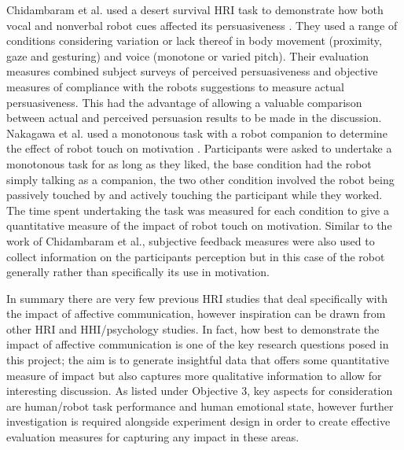 \documentclass[11pt]{article}
\begin{document}
Chidambaram et al. used a desert survival HRI task to demonstrate how both vocal and nonverbal robot cues affected its persuasiveness \cite{chidambaram2012designing}. They used a range of conditions considering variation or lack thereof in body movement (proximity, gaze and gesturing) and voice (monotone or varied pitch). Their evaluation measures combined subject surveys of perceived persuasiveness and objective measures of compliance with the robots suggestions to measure actual persuasiveness. This had the advantage of allowing a valuable comparison between actual and perceived persuasion results to be made in the discussion. Nakagawa et al. used a monotonous task with a robot companion to determine the effect of robot touch on motivation \cite{nakagawa2011effect}. Participants were asked to undertake a monotonous task for as long as they liked, the base condition had the robot simply talking as a companion, the two other condition involved the robot being passively touched by and actively touching the participant while they worked. The time spent undertaking the task was measured for each condition to give a quantitative measure of the impact of robot touch on motivation. Similar to the work of Chidambaram et al., subjective feedback measures were also used to collect information on the participants perception but in this case of the robot generally rather than specifically its use in motivation. 

In summary there are very few previous HRI studies that deal specifically with the impact of affective communication, however inspiration can be drawn from other HRI and HHI/psychology studies. In fact, how best to demonstrate the impact of affective communication is one of the key research questions posed in this project; the aim is to generate insightful data that offers some quantitative measure of impact but also captures more qualitative information to allow for interesting discussion. As listed under Objective 3, key aspects for consideration are human/robot task performance and human emotional state, however further investigation is required alongside experiment design in order to create effective evaluation measures for capturing any impact in these areas.
\end{document}
